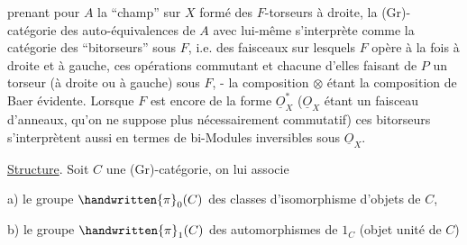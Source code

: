 
prenant pour $A$ la ``champ'' sur $X$ formé des $F$-torseurs à droite, la (Gr)- catégorie des auto-équivalences de $A$ avec lui-même s'interprète comme la catégorie des ``bitorseurs'' sous $F$, i.e. des faisceaux  sur lesquels $F$ opère à la fois à droite et à gauche, ces opérations commutant et chacune d'elles faisant de $P$ un torseur (à droite ou à gauche) sous $F$, - la composition $\otimes$ étant la composition de Baer évidente. Lorsque $F$ est encore de la forme $\underline{O}_{X}^{*}$ ($\underline{O}_{X}$ étant un faisceau d'anneaux, qu'on ne suppose plus nécessairement commutatif) ces bitorseurs s'interprètent aussi en termes de bi-Modules inversibles sous $\underline{O}_{X}$.

\uline{Structure}.  Soit $C$ une (Gr)-catégorie, on lui associe

a) le groupe $\handwritten{\pi}_{0}(C)$ des classes d'isomorphisme d'objets de $C$,

b) le groupe $\handwritten{\pi}_{1}(C)$ des automorphismes de $1_C$ (objet unité de $C$)

